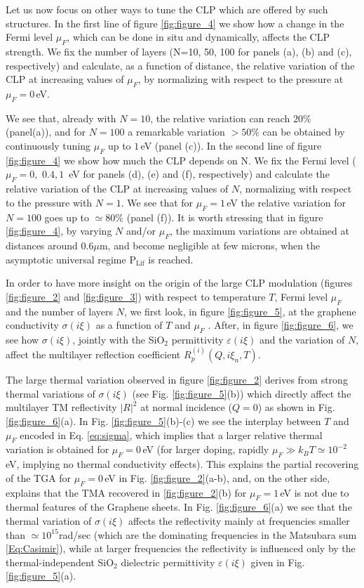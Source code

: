 \documentclass[aps,pra,superscriptaddress,amsmath,amssymb,showpacs,twocolumn,notitlepage]{revtex4-1}
\begin{document}
Let us now focus on other ways to tune the CLP which are offered by such structures. In the first line of figure \ref{fig:figure_4} we show how a change in the Fermi level $\mu_F$, which can be done in situ and dynamically, affects the CLP strength. We fix the number of layers (N=10, 50, 100 for panels (a), (b) and (c), respectively) and calculate, as a function of distance,  the relative variation of the CLP at increasing values of $\mu_F$, by normalizing with respect to the pressure at $\mu_F=0\,$eV. 

We see that, already with $N=10$, the relative variation can reach $20\%$ (panel(a)), and for $N=100$ a remarkable variation $>50\%$ can be obtained by continuously tuning $\mu_F$ up to $1\,$eV (panel (c)). In the second line of figure \ref{fig:figure_4} we show how much the CLP depends on N. We fix the Fermi level ($\mu_F=0, \,\,0.4, 1\,$ eV for panels (d), (e) and (f), respectively) and calculate the relative variation of the CLP at increasing values of $N$, normalizing with respect to the pressure with  $N=1$. We see that for $\mu_F=1\,$eV the relative variation for $N=100$ goes up to $\simeq80\%$  (panel (f)). It is worth stressing that in figure \ref{fig:figure_4}, by varying $N$ and/or $\mu_F$, the maximum variations are obtained at distances around $0.6\mu$m, {and become negligible at few microns, when the asymptotic universal regime $\textrm{P}_{\textrm{Lif}}$ is reached.}

In order to have more insight on the origin of the large CLP modulation (figures \ref{fig:figure_2} and \ref{fig:figure_3}) with respect to temperature $T$, Fermi level $\mu_F$ and the number of layers $N$, we first look, in figure \ref{fig:figure_5}, at the graphene conductivity $\sigma(i\xi)$ as a function of $T$ and $\mu_F$ . After, in figure \ref{fig:figure_6}, {we see how $\sigma(i\xi)$, jointly with the SiO$_2$ permittivity $\varepsilon(i\xi)$ and the variation of $N$, affect the multilayer reflection coefficient $R_p^{(i)}(Q,i\xi_n,T)$.}

The large thermal variation observed in figure \ref{fig:figure_2} derives from strong thermal variations of $\sigma(i\xi)$ (see Fig. \ref{fig:figure_5}(b)) which directly affect the multilayer TM reflectivity $|R|^2$ at normal incidence ($Q=0$) as shown in Fig. \ref{fig:figure_6}(a).
In Fig. \ref{fig:figure_5}(b)-(c) we see the interplay between $T$ and $\mu_F$ encoded in Eq. \eqref{eq:sigma}, which implies that a larger relative thermal variation is obtained for $\mu_F=0\,$eV {(for larger doping,  rapidly $\mu_F\gg k_BT\simeq10^{-2}$eV, implying no thermal conductivity effects). This explains the partial recovering of the TGA for $\mu_F=0\,$eV in Fig. \ref{fig:figure_2}(a-b), and, on the other side, explains that the TMA recovered in \ref{fig:figure_2}(b) for $\mu_F=1\,$eV is not due to thermal features of the Graphene sheets}. In Fig. \ref{fig:figure_6}(a) we see that the thermal variation of $\sigma(i\xi)$ affects the reflectivity mainly at frequencies smaller than $\simeq 10^{15}$rad/sec (which are the dominating frequencies in the Matsubara sum \eqref{Eq:Casimir}), while at larger frequencies the reflectivity is influenced only by the thermal-independent SiO$_2$ dielectric permittivity $\varepsilon(i\xi)$ given in Fig. \ref{fig:figure_5}(a). 
\end{document}
